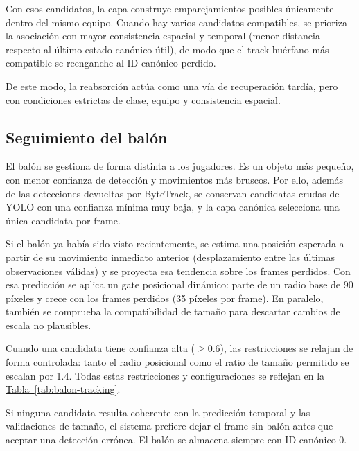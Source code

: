 Con esos candidatos, la capa construye emparejamientos posibles únicamente dentro del mismo equipo. Cuando hay varios candidatos compatibles, se prioriza la asociación con mayor consistencia espacial y temporal (menor distancia respecto al último estado canónico útil), de modo que el track huérfano más compatible se reenganche al ID canónico perdido.

De este modo, la reabsorción actúa como una vía de recuperación tardía, pero con condiciones estrictas de clase, equipo y consistencia espacial.

\subsection{Seguimiento del balón}
\label{subsec:seguimiento-balon-canonico}

El balón se gestiona de forma distinta a los jugadores. Es un objeto más pequeño, con menor confianza de detección y movimientos más bruscos. Por ello, además de las detecciones devueltas por ByteTrack, se conservan candidatas crudas de YOLO con una confianza mínima muy baja, y la capa canónica selecciona una única candidata por frame.

Si el balón ya había sido visto recientemente, se estima una posición esperada a partir de su movimiento inmediato anterior (desplazamiento entre las últimas observaciones válidas) y se proyecta esa tendencia sobre los frames perdidos. Con esa predicción se aplica un gate posicional dinámico: parte de un radio base de 90 píxeles y crece con los frames perdidos (35 píxeles por frame). En paralelo, también se comprueba la compatibilidad de tamaño para descartar cambios de escala no plausibles.

Cuando una candidata tiene confianza alta (\(\geq 0.6\)), las restricciones se relajan de forma controlada: tanto el radio posicional como el ratio de tamaño permitido se escalan por 1.4. Todas estas restricciones y configuraciones se reflejan en la \hyperref[tab:balon-tracking]{Tabla~\ref*{tab:balon-tracking}}.

Si ninguna candidata resulta coherente con la predicción temporal y las validaciones de tamaño, el sistema prefiere dejar el frame sin balón antes que aceptar una detección errónea. El balón se almacena siempre con ID canónico 0.

